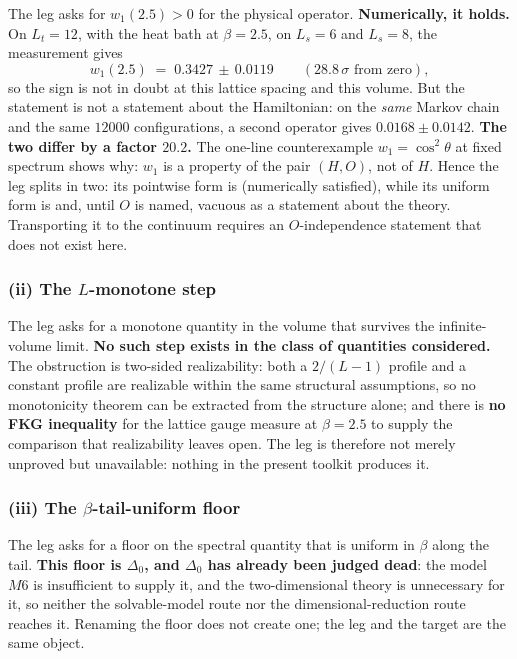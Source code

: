 The leg asks for $w_1(2.5) > 0$ for the physical operator. \textbf{Numerically, it holds.} On
$L_t = 12$, with the  heat bath at $\beta = 2.5$, on $L_s = 6$ and $L_s = 8$, the
measurement gives
\[
  w_1(2.5) \;=\; 0.3427 \,\pm\, 0.0119 \qquad (28.8\,\sigma \text{ from zero}),
\]
so the sign is not in doubt at this lattice spacing and this volume. But the statement is not a
statement about the Hamiltonian: on the \emph{same} Markov chain and the same $12000$
configurations, a second operator gives $0.0168 \pm 0.0142$. \textbf{The two differ by a factor
$20.2$.} The one-line counterexample $w_1 = \cos^2\theta$ at fixed spectrum shows why: $w_1$ is a
property of the pair $(H, O)$, not of $H$. Hence the leg splits in two: its pointwise form is \LE{}
(numerically satisfied), while its uniform form is \LO{} and, until $O$ is named, vacuous as a
statement about the theory. Transporting it to the continuum requires an $O$-independence statement
that does not exist here.

\subsubsection*{(ii) The $L$-monotone step}

The leg asks for a monotone quantity in the volume that survives the infinite-volume limit.
\textbf{No such step exists in the class of quantities considered.} The obstruction is two-sided
realizability: both a $2/(L-1)$ profile and a constant profile are realizable within the same
structural assumptions, so no monotonicity theorem can be extracted from the structure alone; and
there is \textbf{no FKG inequality} for the lattice gauge measure at $\beta = 2.5$ to supply the
comparison that realizability leaves open. The leg is therefore not merely unproved but
unavailable: nothing in the present toolkit produces it. \LN{}

\subsubsection*{(iii) The $\beta$-tail-uniform floor}

The leg asks for a floor on the spectral quantity that is uniform in $\beta$ along the tail.
\textbf{This floor is $\Delta_0$, and $\Delta_0$ has already been judged dead}: the model $M6$ is
insufficient to supply it, and the two-dimensional theory is unnecessary for it, so neither the
solvable-model route nor the dimensional-reduction route reaches it. Renaming the floor does not
create one; the leg and the target are the same object. \LO{}

